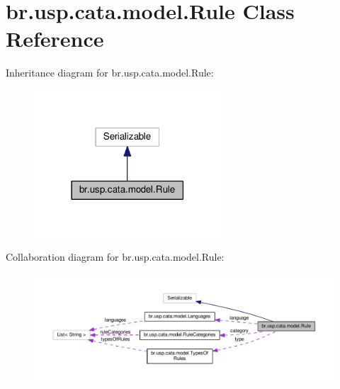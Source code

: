 \hypertarget{classbr_1_1usp_1_1cata_1_1model_1_1_rule}{\section{br.\+usp.\+cata.\+model.\+Rule Class Reference}
\label{classbr_1_1usp_1_1cata_1_1model_1_1_rule}
}


Inheritance diagram for br.\+usp.\+cata.\+model.\+Rule\+:\nopagebreak
\begin{figure}[H]
\begin{center}
\leavevmode
\includegraphics[width=198pt]{classbr_1_1usp_1_1cata_1_1model_1_1_rule__inherit__graph}
\end{center}
\end{figure}


Collaboration diagram for br.\+usp.\+cata.\+model.\+Rule\+:\nopagebreak
\begin{figure}[H]
\begin{center}
\leavevmode
\includegraphics[width=350pt]{classbr_1_1usp_1_1cata_1_1model_1_1_rule__coll__graph}
\end{center}
\end{figure}
